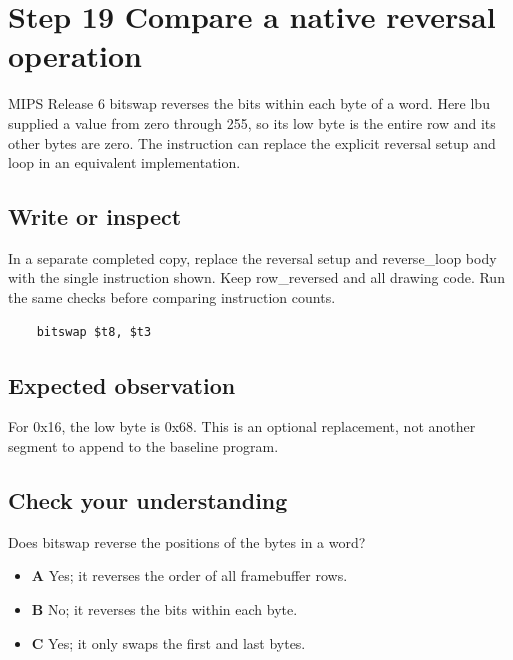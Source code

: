 \section{Step 19 Compare a native reversal
  operation}\label{003-eight-byte-sprite-s19-step-19-compare-a-native-reversal-operation}

MIPS Release 6 bitswap reverses the bits within each byte of a word.
Here lbu supplied a value from zero through 255, so its low byte is the
entire row and its other bytes are zero. The instruction can replace the
explicit reversal setup and loop in an equivalent implementation.

\subsection{Write or
  inspect}\label{003-eight-byte-sprite-s19-write-or-inspect}

In a separate completed copy, replace the reversal setup and
reverse\_loop body with the single instruction shown. Keep row\_reversed
and all drawing code. Run the same checks before comparing instruction
counts.

\begin{verbatim}
    bitswap $t8, $t3
\end{verbatim}

\subsection{Expected
  observation}\label{003-eight-byte-sprite-s19-expected-observation}

For 0x16, the low byte is 0x68. This is an optional replacement, not
another segment to append to the baseline program.

\subsection{Check your
  understanding}\label{003-eight-byte-sprite-s19-check-your-understanding}

Does bitswap reverse the positions of the bytes in a word?

\begin{itemize}
  \tightlist
  \item
        \textbf{A} Yes; it reverses the order of all framebuffer rows.
  \item
        \textbf{B} No; it reverses the bits within each byte.
  \item
        \textbf{C} Yes; it only swaps the first and last bytes.
\end{itemize}
